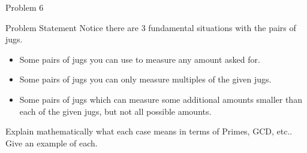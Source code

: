 \begin{problem}{Problem 6}
    \begin{statement}{Problem Statement}
        Notice there are 3 fundamental situations with the pairs of jugs.

        \begin{itemize}
            \item Some pairs of jugs you can use to measure any amount asked for.
            \item Some pairs of jugs you can only measure multiples of the given jugs.
            \item Some pairs of jugs which can measure some additional amounts smaller than each of the given jugs, but not all possible amounts.
        \end{itemize}
        Explain mathematically what each case means in terms of Primes, GCD, etc.. Give an example of each.
    \end{statement}


\end{problem}
